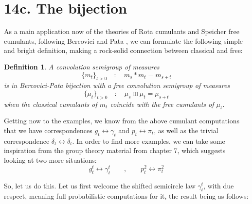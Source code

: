 \documentclass[12pt]{amsbook}
\newtheorem{definition}[theorem]{Definition}
\begin{document}
\section*{14c. The bijection}

As a main application now of the theories of Rota cumulants and Speicher free cumulants, following Bercovici and Pata \cite{bpa}, we can formulate the following simple and bright definition, making a rock-solid connection between classical and free:


\begin{definition}
A convolution semigroup of measures
$$\{m_t\}_{t>0}\quad:\quad m_s*m_t=m_{s+t}$$
is in Bercovici-Pata bijection with a free convolution semigroup of measures
$$\{\mu_t\}_{t>0}\quad:\quad \mu_s\boxplus\mu_t=\mu_{s+t}$$
when the classical cumulants of $m_t$ coincide with the free cumulants of $\mu_t$.
\end{definition}

Getting now to the examples, we know from the above cumulant computations that we have correspondences $g_t\leftrightarrow\gamma_t$ and $p_t\leftrightarrow\pi_t$, as well as the trivial correspondence $\delta_t\leftrightarrow\delta_t$. In order to find more examples, we can take some inspiration from the group theory material from chapter 7, which suggests looking at two more situations:
$$g_t^t\leftrightarrow\gamma_t^t\qquad,\qquad p_t^2\leftrightarrow\pi_t^2$$

So, let us do this. Let us first welcome the shifted semicircle law $\gamma_t^t$, with due respect, meaning full probabilistic computations for it, the result being as follows:
\end{document}
